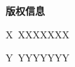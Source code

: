 \documentclass[exam]{cphos}
\begin{document}
\begin{copyrightinfo}
\begin{center}
    {\textbf{版权信息}}
\end{center}


X~X\quad XXX\quad XXX


Y~Y\quad YYY\quad YYY

\vspace{0.5em}
\contactinfo
\end{copyrightinfo}
\end{document}
